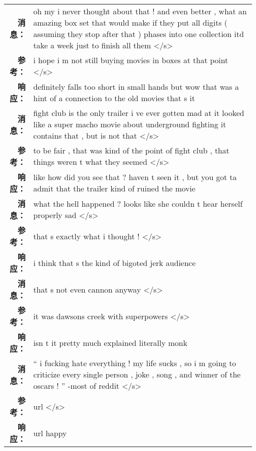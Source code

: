 \begin{tabularx}{0.8\textwidth}{@{}rX@{}}%
\toprule%
\midrule%
\textbf{消息：}&oh my i never thought about that ! and even better , what an amazing box set that would make if they put all digits ( assuming they stop after that ) phases into one collection itd take a week just to finish all them </s>\\%
\textbf{参考：}&i hope i m not still buying movies in boxes at that point </s>\\%
\textbf{响应：}&definitely falls too short in small hands but wow that was a hint of a connection to the old movies that s it\\%
\midrule%
\textbf{消息：}&fight club is the only trailer i ve ever gotten mad at it looked like a super macho movie about underground fighting it contains that , but is not that </s>\\%
\textbf{参考：}&to be fair , that was kind of the point of fight club , that things weren t what they seemed </s>\\%
\textbf{响应：}&like how did you see that ? haven t seen it , but you got ta admit that the trailer kind of ruined the movie\\%
\midrule%
\textbf{消息：}&what the hell happened ? looks like she couldn t hear herself properly sad </s>\\%
\textbf{参考：}&that s exactly what i thought ! </s>\\%
\textbf{响应：}&i think that s the kind of bigoted jerk audience\\%
\midrule%
\textbf{消息：}&that s not even cannon anyway </s>\\%
\textbf{参考：}&it was dawsons creek with superpowers </s>\\%
\textbf{响应：}&isn t it pretty much explained literally monk\\%
\midrule%
\textbf{消息：}&`` i fucking hate everything ! my life sucks , so i m going to criticize every single person , joke , song , and winner of the oscars ! '' {-}most of reddit </s>\\%
\textbf{参考：}&url </s>\\%
\textbf{响应：}&url happy\\%
\midrule\bottomrule%
%
\end{tabularx}